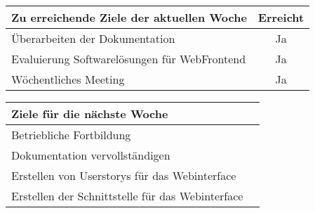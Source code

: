 \begin{tabularx}{\textwidth}{Xc}
    \arrayrulecolor{OliveGreen}
    \toprule
    {\bfseries Zu erreichende Ziele der aktuellen Woche} & {\bfseries Erreicht} \\
    \midrule[2pt]
    Überarbeiten der Dokumentation                        &Ja                \\
    \rowcolor{OliveGreen!15}
   Evaluierung Softwarelösungen für WebFrontend           &Ja                \\
    \rowcolor{OliveGreen!15}
    Wöchentliches Meeting                                 &Ja                \\
   \bottomrule[2pt]
\end{tabularx}
%
\vspace{1cm}
%
\begin{tabularx}{\textwidth}{Xc}
    \arrayrulecolor{OliveGreen}
    \toprule
    {\bfseries Ziele für die nächste Woche}        &                         \\
    \midrule[2pt]
    Betriebliche Fortbildung                       &                         \\
    \rowcolor{OliveGreen!15}
    Dokumentation vervollständigen                 &                         \\
    \rowcolor{OliveGreen!15}
    Erstellen von Userstorys für das Webinterface  &                         \\
    \rowcolor{OliveGreen!15}
    Erstellen der Schnittstelle für das Webinterface &                       \\
\end{tabularx}
